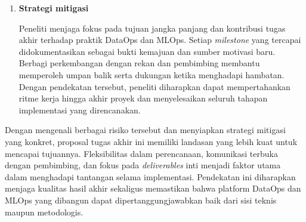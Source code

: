 \begin{enumerate}
\begin{enumerate}[label=\alph*)]
        \vspace{0.5em}
        
        \item \textbf{Strategi mitigasi}
        
        Peneliti menjaga fokus pada tujuan jangka panjang dan kontribusi tugas akhir terhadap praktik DataOps dan MLOps. Setiap \textit{milestone} yang tercapai didokumentasikan sebagai bukti kemajuan dan sumber motivasi baru. Berbagi perkembangan dengan rekan dan pembimbing membantu memperoleh umpan balik serta dukungan ketika menghadapi hambatan. Dengan pendekatan tersebut, peneliti diharapkan dapat mempertahankan ritme kerja hingga akhir proyek dan menyelesaikan seluruh tahapan implementasi yang direncanakan.
        
        \vspace{0.5em}
    \end{enumerate}
\end{enumerate}

Dengan mengenali berbagai risiko tersebut dan menyiapkan strategi mitigasi yang konkret, proposal tugas akhir ini memiliki landasan yang lebih kuat untuk mencapai tujuannya. Fleksibilitas dalam perencanaan, komunikasi terbuka dengan pembimbing, dan fokus pada \textit{deliverables} inti menjadi faktor utama dalam menghadapi tantangan selama implementasi. Pendekatan ini diharapkan menjaga kualitas hasil akhir sekaligus memastikan bahwa platform DataOps dan MLOps yang dibangun dapat dipertanggungjawabkan baik dari sisi teknis maupun metodologis.

